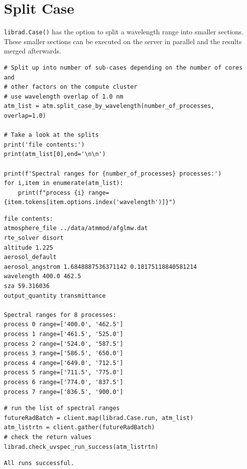 \section{Split Case}
\label{sec:SplitCase}

\verb+librad.Case()+ has the option to split a wavelength range into smaller sections.
These smaller sections can be executed on the server in parallel and the results merged afterwards.



\begin{lstlisting}[style=tinysize]
# Split up into number of sub-cases depending on the number of cores and 
# other factors on the compute cluster
# use wavelength overlap of 1.0 nm
atm_list = atm.split_case_by_wavelength(number_of_processes, overlap=1.0)  

# Take a look at the splits
print('file contents:')
print(atm_list[0],end='\n\n')

print(f'Spectral ranges for {number_of_processes} processes:')
for i,item in enumerate(atm_list):
    print(f"process {i} range={item.tokens[item.options.index('wavelength')]}")
\end{lstlisting}


\begin{lstlisting}[style=outcellstyle]
file contents:
atmosphere_file ../data/atmmod/afglmw.dat
rte_solver disort
altitude 1.225
aerosol_default 
aerosol_angstrom 1.6848887536371142 0.18175118840581214
wavelength 400.0 462.5
sza 59.316036
output_quantity transmittance

Spectral ranges for 8 processes:
process 0 range=['400.0', '462.5']
process 1 range=['461.5', '525.0']
process 2 range=['524.0', '587.5']
process 3 range=['586.5', '650.0']
process 4 range=['649.0', '712.5']
process 5 range=['711.5', '775.0']
process 6 range=['774.0', '837.5']
process 7 range=['836.5', '900.0']

\end{lstlisting}


\begin{lstlisting}[style=tinysize]
# run the list of spectral ranges
futureRadBatch = client.map(librad.Case.run, atm_list)
atm_listrtn = client.gather(futureRadBatch) 
# check the return values
librad.check_uvspec_run_success(atm_listrtn)
\end{lstlisting}


\begin{lstlisting}[style=outcellstyle]
All runs successful.

\end{lstlisting}


